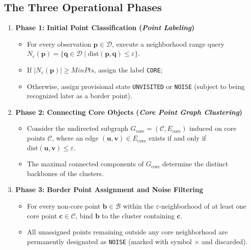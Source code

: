 \subsection{The Three Operational Phases}

\begin{enumerate}
    \item \textbf{Phase 1: Initial Point Classification (\textit{Point Labeling})}
    \begin{itemize}[noitemsep]
        \item For every observation $\mathbf{p} \in \mathcal{D}$, execute a neighborhood range query $N_\varepsilon(\mathbf{p}) = \{\mathbf{q} \in \mathcal{D} \mid \mathrm{dist}(\mathbf{p}, \mathbf{q}) \le \varepsilon\}$.
        \item If $|N_\varepsilon(\mathbf{p})| \ge MinPts$, assign the label \texttt{CORE};
        \item Otherwise, assign provisional state \texttt{UNVISITED} or \texttt{NOISE} (subject to being recognized later as a border point).
    \end{itemize}

    \item \textbf{Phase 2: Connecting Core Objects (\textit{Core Point Graph Clustering})}
    \begin{itemize}[noitemsep]
        \item Consider the undirected subgraph $G_{\mathrm{core}} = (\mathcal{C}, E_{\mathrm{core}})$ induced on core points $\mathcal{C}$, where an edge $(\mathbf{u}, \mathbf{v}) \in E_{\mathrm{core}}$ exists if and only if $\mathrm{dist}(\mathbf{u}, \mathbf{v}) \le \varepsilon$.
        \item The maximal connected components of $G_{\mathrm{core}}$ determine the distinct backbones of the clusters.
    \end{itemize}

    \item \textbf{Phase 3: Border Point Assignment and Noise Filtering}
    \begin{itemize}[noitemsep]
        \item For every non-core point $\mathbf{b} \in \mathcal{B}$ within the $\varepsilon$-neighborhood of at least one core point $\mathbf{c} \in \mathcal{C}$, bind $\mathbf{b}$ to the cluster containing $\mathbf{c}$.
        \item All unassigned points remaining outside any core neighborhood are permanently designated as \texttt{NOISE} (marked with symbol $\times$ and discarded).
    \end{itemize}
\end{enumerate}

